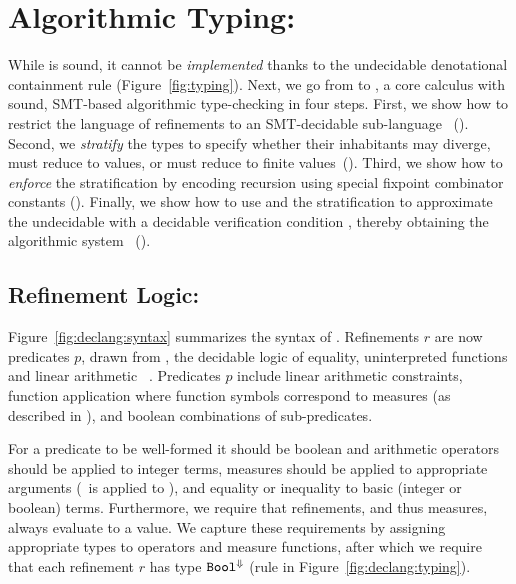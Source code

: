 \renewcommand\rimpl{\rsubbase}
\renewcommand{\rtdimp}{\rsubbased}
%
\section{Algorithmic Typing: \declang}\label{sec:typing}



While \undeclang is sound, it cannot be \emph{implemented} 
thanks to the undecidable denotational containment rule \rsubbase
(Figure~\ref{fig:typing}).
%
Next, we go from \undeclang to \declang, a core calculus 
with sound, SMT-based algorithmic type-checking in four 
steps.
%
First, we show how to restrict the language of 
refinements to an SMT-decidable sub-language 
\logiclang~().
%
Second, we \emph{stratify} the types to specify 
whether their inhabitants may diverge, must reduce
to values, or must reduce to finite values~().
%
Third, we show how to \emph{enforce} the stratification
by encoding recursion using special fixpoint combinator 
constants ().
%
Finally, we show how to use \logiclang and the 
stratification to approximate the undecidable \rsubbase
with a decidable verification condition \rsubbased, thereby 
obtaining the algorithmic system \declang~().


\subsection{Refinement Logic: \logiclang}\label{sec:typing:logic}

Figure~\ref{fig:declang:syntax} summarizes the syntax of \declang.
Refinements $r$ are now predicates $p$, drawn from 
\logiclang, the decidable logic of equality, 
uninterpreted functions and linear arithmetic
~\cite{Nelson81}.
%
Predicates $p$ include linear arithmetic constraints,
function application where function symbols correspond
to measures (as described in ), and 
boolean combinations of sub-predicates.

For a predicate to be well-formed it should be boolean and
arithmetic operators 
should be applied to integer terms, measures should be applied 
to appropriate arguments 
(\ie \eisNull\ is applied to \tintlist),
and equality or inequality to basic 
(integer or boolean) terms.
%
Furthermore, we require that refinements, and thus measures,
always evaluate to a value.
%
We capture these requirements by assigning appropriate types 
to operators and measure functions, after which we require that
each refinement $r$ has type ${\texttt{Bool}}^{\Downarrow}$ (rule \rwbased in
Figure~\ref{fig:declang:typing}).

